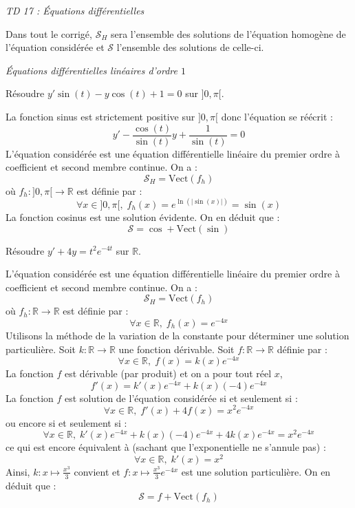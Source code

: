 \documentclass[a4paper,10pt]{report}
\begin{document}
\everymath{\displaystyle}

\begin{center}
\textit{{ {\huge TD 17 : Équations différentielles}}}
\end{center}


\medskip

\noindent Dans tout le corrigé, $\mathcal{S}_H$ sera l'ensemble des solutions de l'équation homogène de l'équation considérée et $\mathcal{S}$ l'ensemble des solutions de celle-ci.


\medskip

\begin{center}
\textit{{ {\large Équations différentielles linéaires d'ordre $1$}}}
\end{center}

\medskip

\begin{Exa} Résoudre $y' \sin(t)-y \cos(t)+1=0$ sur $]0,\pi[$.
\end{Exa}

\corr La fonction sinus est strictement positive sur $]0, \pi[$ donc l'équation se réécrit :
$$ y' - \dfrac{\cos(t)}{\sin(t)} y + \dfrac{1}{\sin(t)} = 0$$
L'équation considérée est une équation différentielle linéaire du premier ordre à coefficient et second membre continue. On a :
$$ \mathcal{S}_H = \textrm{Vect}(f_h)$$
où $f_h : ]0, \pi[ \rightarrow \mathbb{R}$ est définie par :
$$ \forall x \in ]0, \pi[, \; f_h(x) = e^{ \ln( \vert \sin(x) \vert)} = \sin(x)$$
La fonction cosinus est une solution évidente. On en déduit que :
$$ \mathcal{S} = \cos +  \textrm{Vect}(\sin)$$

\begin{Exa} Résoudre $y'+4y = t^2 e^{-4t}$ sur $\mathbb{R}$. 
\end{Exa}

\corr L'équation considérée est une équation différentielle linéaire du premier ordre à coefficient et second membre continue. On a :
$$ \mathcal{S}_H = \textrm{Vect}(f_h)$$
où $f_h : \mathbb{R} \rightarrow \mathbb{R}$ est définie par :
$$ \forall x \in \mathbb{R}, \; f_h(x) = e^{-4x}$$
Utilisons la méthode de la variation de la constante pour déterminer une solution particulière. Soit $k : \mathbb{R} \rightarrow \mathbb{R}$ une fonction dérivable. Soit $f : \mathbb{R} \rightarrow \mathbb{R}$ définie par :
$$ \forall x \in \mathbb{R}, \; f(x) = k(x) e^{-4x}$$
La fonction $f$ est dérivable (par produit) et on a pour tout réel $x$,
$$ f'(x) = k'(x) e^{-4x} + k(x)(-4)e^{-4x}$$
La fonction $f$ est solution de l'équation considérée si et seulement si :
$$ \forall x \in \mathbb{R}, \; f'(x)+4f(x) = x^2 e^{-4x}$$
ou encore si et seulement si :
$$ \forall x \in \mathbb{R}, \; k'(x) e^{-4x} + k(x)(-4)e^{-4x} + 4k(x) e^{-4x} = x^2 e^{-4x}$$
ce qui est encore équivalent à (sachant que l'exponentielle ne s'annule pas) :
$$ \forall x \in \mathbb{R}, \; k'(x) = x^2$$
Ainsi, $k : x \mapsto \tfrac{x^3}{3}$ convient et $f : x \mapsto \tfrac{x^3}{3} e^{-4x}$ est une solution particulière. On en déduit que :
$$ \mathcal{S} = f +  \textrm{Vect}(f_h)$$
\end{document}
